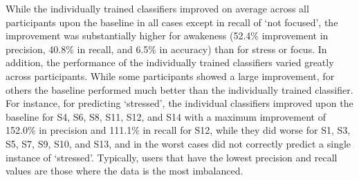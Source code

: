 While the individually trained classifiers
improved on average across all participants upon the baseline in all
cases except in recall of `not focused', the improvement was
substantially higher for awakeness (52.4\% improvement in precision,
40.8\% in recall, and 6.5\% in accuracy) than for stress or focus. In addition,
the performance of the individually trained classifiers varied greatly
across participants. While some participants showed a large
improvement, for others the baseline performed much better than the
individually trained classifier. For instance, for predicting
`stressed', the individual classifiers improved upon the baseline for
S4, S6, S8, S11, S12, and S14 with a maximum improvement of 152.0\% in
precision and 111.1\% in recall for S12, while they did worse for S1,
S3, S5, S7, S9, S10, and S13, and in the worst cases did not correctly
predict a single instance of `stressed'. Typically, users that have the
lowest precision and recall values are those where the data is the
most imbalanced.\\[-0.1cm]
%


